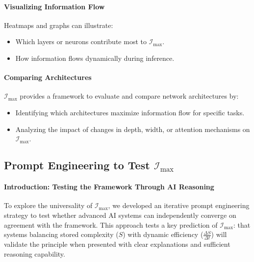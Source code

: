 \documentclass[12pt]{article}
\begin{document}
\paragraph{Visualizing Information Flow}
Heatmaps and graphs can illustrate:
\begin{itemize}
    \item Which layers or neurons contribute most to \(\mathcal{I}_{\text{max}}\).
    \item How information flows dynamically during inference.
\end{itemize}

\paragraph{Comparing Architectures}
\(\mathcal{I}_{\text{max}}\) provides a framework to evaluate and compare network architectures by:
\begin{itemize}
    \item Identifying which architectures maximize information flow for specific tasks.
    \item Analyzing the impact of changes in depth, width, or attention mechanisms on \(\mathcal{I}_{\text{max}}\).
\end{itemize}

\subsection{Prompt Engineering to Test \(\mathcal{I}_{\text{max}}\)}

\paragraph{Introduction: Testing the Framework Through AI Reasoning}
To explore the universality of \(\mathcal{I}_{\text{max}}\), we developed an iterative prompt engineering strategy to test whether advanced AI systems can independently converge on agreement with the framework. This approach tests a key prediction of \(\mathcal{I}_{\text{max}}\): that systems balancing stored complexity (\(S\)) with dynamic efficiency (\(\frac{\Delta S}{\Delta t}\)) will validate the principle when presented with clear explanations and sufficient reasoning capability.
\end{document}
